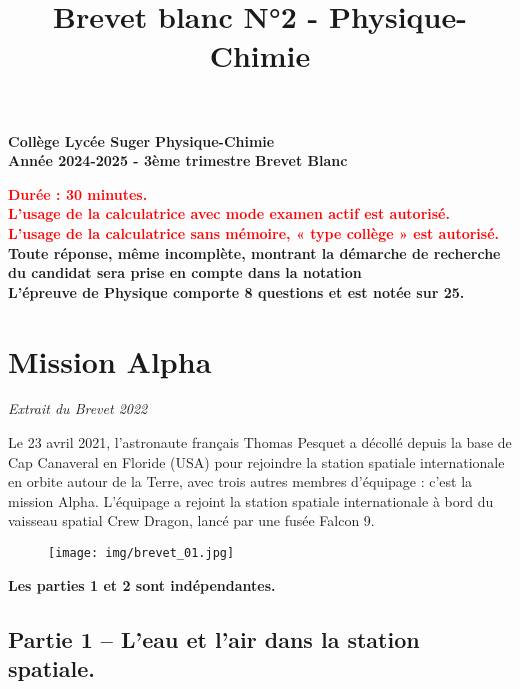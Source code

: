 \documentclass[answers]{exam}
\title{Brevet blanc N°2 - Physique-Chimie}
\begin{document}
\textbf{Collège Lycée Suger}
\hfill
\textbf{Physique-Chimie} \\

\textbf{Année 2024-2025 - 3ème trimestre}
\hfill
\textbf{Brevet Blanc} \par

{\let\newpage\relax\maketitle}

\begin{center}
\textbf{\textcolor{red}{Durée : 30 minutes. \\
L'usage de la calculatrice avec mode examen actif est autorisé. \\ 
L'usage de la calculatrice sans mémoire, « type collège » est autorisé.}} \\
\textbf{Toute réponse, même incomplète, montrant la démarche de recherche du candidat sera prise en compte dans la notation} \\
\textbf{L'épreuve de Physique comporte 8 questions et est notée sur 25.} \\
\end{center}

\section*{Mission Alpha}

\textit{Extrait du Brevet 2022}
\vspace{1em}

Le 23 avril 2021, l'astronaute français Thomas Pesquet a décollé depuis la base de Cap Canaveral en Floride (USA) pour rejoindre la station spatiale internationale en orbite autour de la Terre, avec trois autres membres d'équipage : c'est la mission Alpha.
L'équipage a rejoint la station spatiale internationale à bord du vaisseau spatial Crew Dragon, lancé par une fusée Falcon 9.

\begin{figure}[H]
  \centering
  \texttt{[image: img/brevet\_01.jpg]}
\end{figure}


\vspace{0.3cm}
\textbf{Les parties 1 et 2 sont indépendantes.}

\subsection*{Partie 1 – L’eau et l’air dans la station spatiale.}
\end{document}
